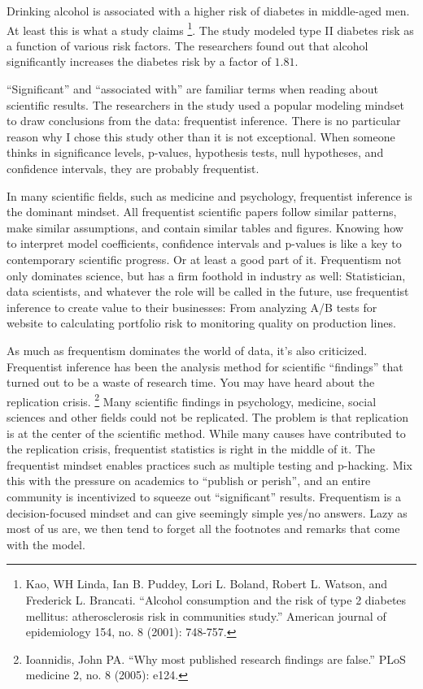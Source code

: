 \documentclass[
  10pt,
]{scrbook}
\begin{document}
Drinking alcohol is associated with a higher risk of diabetes in middle-aged men.
At least this is what a study claims \footnote{Kao, WH Linda, Ian B. Puddey, Lori L. Boland, Robert L. Watson, and Frederick L. Brancati. ``Alcohol consumption and the risk of type 2 diabetes mellitus: atherosclerosis risk in communities study.'' American journal of epidemiology 154, no. 8 (2001): 748-757.}.
The study modeled type II diabetes risk as a function of various risk factors.
The researchers found out that alcohol significantly increases the diabetes risk by a factor of \(1.81\).

``Significant'' and ``associated with'' are familiar terms when reading about scientific results.
The researchers in the study used a popular modeling mindset to draw conclusions from the data: frequentist inference.
There is no particular reason why I chose this study other than it is not exceptional.
When someone thinks in significance levels, p-values, hypothesis tests, null hypotheses, and confidence intervals, they are probably frequentist.

In many scientific fields, such as medicine and psychology, frequentist inference is the dominant mindset.
All frequentist scientific papers follow similar patterns, make similar assumptions, and contain similar tables and figures.
Knowing how to interpret model coefficients, confidence intervals and p-values is like a key to contemporary scientific progress.
Or at least a good part of it.
Frequentism not only dominates science, but has a firm foothold in industry as well:
Statistician, data scientists, and whatever the role will be called in the future, use frequentist inference to create value to their businesses:
From analyzing A/B tests for website to calculating portfolio risk to monitoring quality on production lines.

As much as frequentism dominates the world of data, it's also criticized.
Frequentist inference has been the analysis method for scientific ``findings'' that turned out to be a waste of research time.
You may have heard about the replication crisis. \footnote{Ioannidis, John PA. ``Why most published research findings are false.'' PLoS medicine 2, no. 8 (2005): e124.}
Many scientific findings in psychology, medicine, social sciences and other fields could not be replicated.
The problem is that replication is at the center of the scientific method.
While many causes have contributed to the replication crisis, frequentist statistics is right in the middle of it.
The frequentist mindset enables practices such as multiple testing and p-hacking.
Mix this with the pressure on academics to ``publish or perish'', and an entire community is incentivized to squeeze out ``significant'' results.
Frequentism is a decision-focused mindset and can give seemingly simple yes/no answers.
Lazy as most of us are, we then tend to forget all the footnotes and remarks that come with the model.
\end{document}
